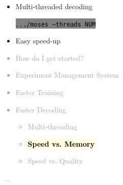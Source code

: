 \documentclass[landscape]{uedslides2C}
\newcommand{\currenttopic}[1]{\colorbox{lightyellow}{\textcolor{black}{\bf #1}}}
\newcommand{\littlecode}[1]{\colorbox{gray}{\textcolor{black}{\small \tt #1}}}
\begin{document}


\vspace{15mm}
\begin{itemize}
\item Multi-threaded decoding 
\begin{center}
\littlecode{.../moses --threads NUM}
\end{center}
\item Easy speed-up

\end{itemize}



\vspace{-5mm}
\textcolor{darkgrey}{
\begin{itemize} \itemsep -1mm
\item {How do I get started?}
\item {Experiment Management System}
\item {Faster Training}
\item {Faster Decoding}
  \begin{itemize}
  \item {Multi-threading}
  \item \currenttopic{Speed vs. Memory}
  \item Speed vs. Quality
  \end{itemize}
\end{itemize}
...
}



\end{document}
